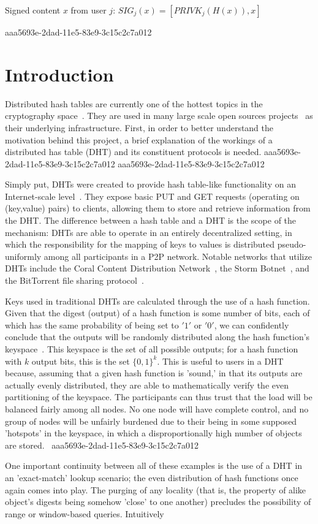 \documentclass[12pt]{article}
\begin{document}
Signed content $x$ from user $j$: $SIG_j(x) = \left[ PRIVK_j( H(x) ), x \right]$

aaa5693e-2dad-11e5-83e9-3c15c2c7a012\section{Introduction}
\par Distributed hash tables are currently one of the hottest topics in the cryptography space~\cite{Stoica:2001dj,Rowstron:2001ea,Ratnasamy:2001wn}. They are used in many large scale open sources projects~\cite{Freitas:2013tb,Xu:2010vs,Perfitt:2010fh} as their underlying infrastructure. First, in order to better understand the motivation behind this project, a brief explanation of the workings of a distributed has table (DHT) and its constituent protocols is needed.
aaa5693e-2dad-11e5-83e9-3c15c2c7a012
aaa5693e-2dad-11e5-83e9-3c15c2c7a012\par Simply put, DHTs were created to provide hash table-like functionality on an Internet-scale level~\cite{Ratnasamy:2001wn}. They expose basic PUT and GET requests (operating on (key,value) pairs) to clients, allowing them to store and retrieve information from the DHT. The difference between a hash table and a DHT is the scope of the mechanism: DHTs are able to operate in an entirely decentralized setting, in which the responsibility for the mapping of keys to values is distributed pseudo-uniformly among all participants in a P2P network. Notable networks that utilize DHTs include the Coral Content Distribution Network~\cite{Freedman:2004vb}, the Storm Botnet~\cite{Holz:2008uk}, and the BitTorrent file sharing protocol~\cite{Cohen:y1_8mBnw}.

\par Keys used in traditional DHTs are calculated through the use of a hash function. Given that the digest (output) of a hash function is some number of bits, each of which has the same probability of being set to $'1'$ or $'0'$, we can confidently conclude that the outputs will be randomly distributed along the hash function's keyspace~. This keyspace is the set of all possible outputs; for a hash function with $k$ output bits, this is the set $\{0,1\}^k$. This is useful to users in a DHT because, assuming that a given hash function is 'sound,' in that its outputs are actually evenly distributed, they are able to mathematically verify the even partitioning of the keyspace. The participants can thus trust that the load will be balanced fairly among all nodes. No one node will have complete control, and no group of nodes will be unfairly burdened due to their being in some supposed 'hotspots' in the keyspace, in which a disproportionally high number of objects are stored.~
aaa5693e-2dad-11e5-83e9-3c15c2c7a012
\par One important continuity between all of these examples is the use of a DHT in an 'exact-match' lookup scenario; the even distribution of hash functions once again comes into play. The purging of any locality (that is, the property of alike object's digests being somehow 'close' to one another) precludes the possibility of range or window-based queries. Intuitively
\end{document}
